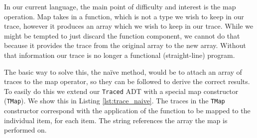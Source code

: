         In our current language, the main point of difficulty and interest is the map operation.
        Map takes in a function, which is not a type we wish to keep in our trace, however it produces an array which we wish to keep in our trace.
        While we might be tempted to just discard the function component, we cannot do that because it provides the trace from the original array to the new array.
        Without that information our trace is no longer a functional (straight-line) program.

        The basic way to solve this, the naïve method, would be to attach an array of traces to the map operator, so they can be followed to derive the correct results.
        To easily do this we extend our \texttt{Traced} ADT with a special map constructor (\texttt{TMap}).
        We show this in Listing \ref{lst:trace_naive}.
        The traces in the \texttt{TMap} constructor correspond with the application of the function to be mapped to the individual item, for each item.
        The string references the array the map is performed on.

